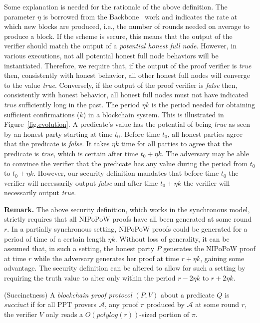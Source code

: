 Some explanation is needed for the rationale of the above definition. The
parameter $\eta$ is borrowed from the Backbone~\cite{backbone} work and
indicates the rate at which new blocks are produced, i.e., the number of rounds
needed on average to produce a block. If the scheme is secure, this means that
the output of the verifier should match the output of a \emph{potential honest
full node}. However, in various executions, not all potential honest full node
behaviors will be instantiated. Therefore, we require that, if the output of the
proof verifier is \emph{true} then, consistently with honest behavior, all other
honest full nodes will converge to the value \emph{true}. Conversely, if the
output of the proof verifier is \emph{false} then, consistently with honest
behavior, all honest full nodes must not have indicated \emph{true} sufficiently
long in the past. The period $\eta k$ is the period needed for obtaining
sufficient confirmations ($k$) in a blockchain system. This is illustrated in
Figure~\ref{fig.evolution}. A predicate's value has the potential of being
\emph{true} as seen by an honest party starting at time $t_0$. Before time
$t_0$, all honest parties agree that the predicate is \emph{false}. It takes
$\eta k$ time for all parties to agree that the predicate is \emph{true}, which
is certain after time $t_0 + \eta k$. The adversary may be able to convince the
verifier that the predicate has any value during the period from $t_0$ to
$t_0 + \eta k$. However, our security definition mandates that before time $t_0$
the verifier will necessarily output \emph{false} and after time $t_0 + \eta k$
the verifier will necessarily output \emph{true}.

\noindent
\textbf{Remark. } The above security definition, which works in the synchronous
model, strictly requires that all NIPoPoW proofs have all been generated at some
round $r$. In a partially synchronous setting, NIPoPoW proofs could be generated
for a period of time of a certain length $\eta k$. Without loss of generality,
it can be assumed that, in such a setting, the honest party $P$ generates the
NIPoPoW proof at time $r$ while the adversary generates her proof at time
$r + \eta k$, gaining some advantage. The security definition can be altered to
allow for such a setting by requiring the truth value to alter only within the
period $r - 2\eta k$ to $r + 2\eta k$.

\begin{definition}{(Succinctness)}
A \emph{blockchain proof protocol} $(P, V)$ about a predicate $Q$ is
\emph{succinct} if for all PPT provers $\mathcal{A}$, any proof $\pi$ produced
by $\mathcal{A}$ at some round $r$, the verifier $V$ only reads a
$O(polylog(r))$-sized portion of $\pi$.
\end{definition}

